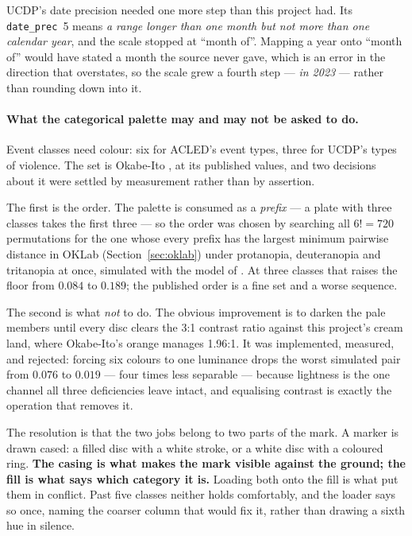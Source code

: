 \documentclass[11pt]{article}
\begin{document}
UCDP's date precision needed one more step than this project had. Its
\texttt{date\_prec}~5 means \emph{a range longer than one month but not
more than one calendar year}, and the scale stopped at ``month of''.
Mapping a year onto ``month of'' would have stated a month the source never
gave, which is an error in the direction that overstates, so the scale grew
a fourth step --- \emph{in 2023} --- rather than rounding down into it.

\paragraph{What the categorical palette may and may not be asked to do.}
Event classes need colour: six for ACLED's event types, three for UCDP's
types of violence. The set is Okabe-Ito \parencite{okabe-ito}, at its published
values, and two decisions about it were settled by measurement rather than
by assertion.

The first is the order. The palette is consumed as a \emph{prefix} --- a
plate with three classes takes the first three --- so the order was chosen
by searching all $6! = 720$ permutations for the one whose every prefix has
the largest minimum pairwise distance in OKLab
(Section~\ref{sec:oklab}) under protanopia, deuteranopia and tritanopia at
once, simulated with the model of \textcite{machado-cvd}. At three classes
that raises the floor from $0.084$ to $0.189$; the published order is a
fine set and a worse sequence.

The second is what \emph{not} to do. The obvious improvement is to darken
the pale members until every disc clears the 3:1 contrast ratio against
this project's cream land, where Okabe-Ito's orange manages 1.96:1. It was
implemented, measured, and rejected: forcing six colours to one luminance
drops the worst simulated pair from $0.076$ to $0.019$ --- four times less
separable --- because lightness is the one channel all three deficiencies
leave intact, and equalising contrast is exactly the operation that removes
it.

The resolution is that the two jobs belong to two parts of the mark. A
marker is drawn cased: a filled disc with a white stroke, or a white disc
with a coloured ring. \textbf{The casing is what makes the mark visible
against the ground; the fill is what says which category it is.} Loading
both onto the fill is what put them in conflict. Past five classes neither
holds comfortably, and the loader says so once, naming the coarser column
that would fix it, rather than drawing a sixth hue in silence.
\end{document}
